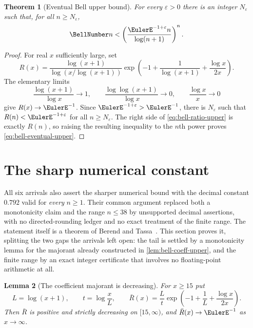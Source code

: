 \documentclass[11pt,a4paper,oneside,openany]{book}
\newtheorem{theorem}{Theorem}[chapter]
\newtheorem{lemma}[theorem]{Lemma}
\theoremstyle{definition}
\theoremstyle{remark}
\begin{document}
\begin{theorem}[Eventual Bell upper bound]\label{thm:bell-eventual-upper}
For every $\varepsilon>0$ there is an integer $N_\varepsilon$ such that, for
all $n\ge N_\varepsilon$,
\begin{equation}\label{eq:bell-eventual-upper}
 \BellNumber n<
 \left(\frac{\EulerE^{-1+\varepsilon}n}{\log(n+1)}\right)^n.
\end{equation}
\end{theorem}
\begin{proof}
For real $x$ sufficiently large, set
\[
 R(x)=\frac{\log(x+1)}{\log(x/\log(x+1))}
 \exp\!\left(-1+\frac1{\log(x+1)}+\frac{\log x}{2x}\right).
\]
The elementary limits
\[
 \frac{\log(x+1)}{\log x}\longrightarrow1,
 \qquad \frac{\log\log(x+1)}{\log x}\longrightarrow0,
 \qquad \frac{\log x}{x}\longrightarrow0
\]
give $R(x)\to\EulerE^{-1}$.  Since
$\EulerE^{-1+\varepsilon}>\EulerE^{-1}$, there is $N_\varepsilon$ such that
$R(n)<\EulerE^{-1+\varepsilon}$ for all $n\ge N_\varepsilon$.  The right side
of \cref{eq:bell-ratio-upper} is exactly $R(n)$, so raising the resulting
inequality to the $n$th power proves \cref{eq:bell-eventual-upper}.
\end{proof}

\section{The sharp numerical constant}
All six arrivals also assert the sharper numerical bound with the decimal
constant $0.792$ valid for \emph{every} $n\ge1$.  Their common argument
replaced both a monotonicity claim and the range $n\le38$ by unsupported
decimal assertions, with no directed-rounding ledger and no exact treatment of
the finite range.  The statement itself is a theorem of Berend and
Tassa~\cite{BerendTassa2010}.  This section proves it, splitting the two gaps
the arrivals left open: the tail is settled by a monotonicity lemma for the
majorant already constructed in \cref{lem:bell-coeff-upper}, and the finite
range by an exact integer certificate that involves no floating-point
arithmetic at all.

\begin{lemma}[The coefficient majorant is decreasing]
\label{lem:bell-majorant-decreasing}
For $x\ge15$ put
\begin{equation}
 L=\log(x+1),\qquad
 t=\log\frac{x}{L},\qquad
 \bar R(x)=\frac Lt\exp\!\left(-1+\frac1L+\frac{\log x}{2x}\right).
                                                                  \label{eq:bell-majorant}
\end{equation}
Then $\bar R$ is positive and strictly decreasing on $[15,\infty)$, and
$\bar R(x)\to\EulerE^{-1}$ as $x\to\infty$.
\end{lemma}
\end{document}
